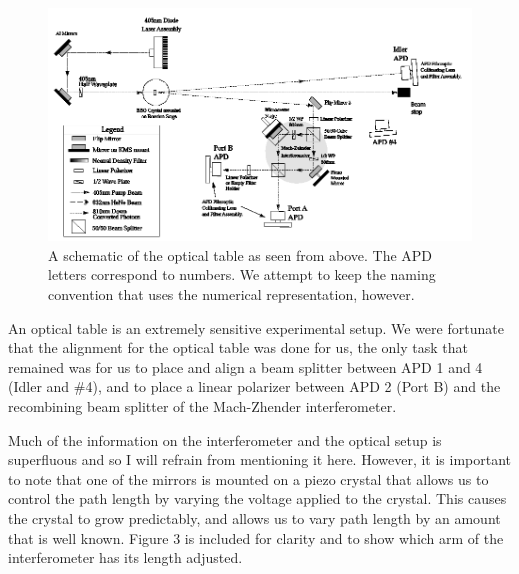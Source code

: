 \documentclass{article}
\begin{document}
\begin{figure}[!htb]
	\centering
	\includegraphics[scale=.5]{apparatus_setup.png}
	\caption{A schematic of the optical table as seen from above.  The APD letters correspond to numbers.  We attempt to keep the naming convention that uses the numerical representation, however.}
\end{figure}

An optical table is an extremely sensitive experimental setup.  We were fortunate that the alignment for the optical table was done for us, the only task that remained was for us to place and align a beam splitter between APD 1 and 4 (Idler and \#4), and to place a linear polarizer between APD 2 (Port B) and the recombining beam splitter of the Mach-Zhender interferometer.

\hspace{.25cm}

Much of the information on the interferometer and the optical setup is superfluous and so I will refrain from mentioning it here.  However, it is important to note that one of the mirrors is mounted on a piezo crystal that allows us to control the path length by varying the voltage applied to the crystal.  This causes the crystal to grow predictably, and allows us to vary path length by an amount that is well known.  Figure 3 is included for clarity and to show which arm of the interferometer has its length adjusted.

\hspace{.25cm}
\end{document}
